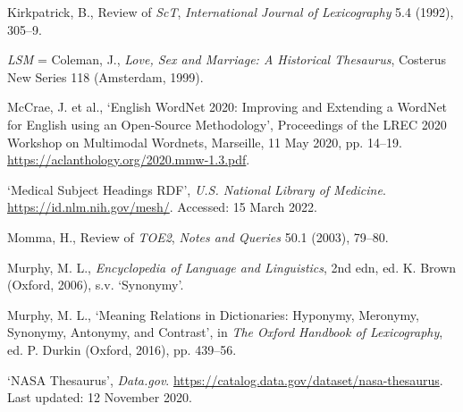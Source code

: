 \begin{list}{}
\item %
Kirkpatrick, B., Review of \textit{ScT}, \textit{International Journal of Lexicography} 5.4 (1992), 305–9.


\item %
\textit{LSM} = Coleman, J., \textit{Love, Sex and Marriage: A Historical Thesaurus}, Costerus New Series 118 (Amsterdam, 1999).


\item %
McCrae, J. et al., `English WordNet 2020: Improving and Extending a WordNet for English using an Open-Source Methodology', Proceedings of the LREC 2020 Workshop on Multimodal Wordnets, Marseille, 11 May 2020, pp. 14–19. \url{https://aclanthology.org/2020.mmw-1.3.pdf}.

\item %
`Medical Subject Headings RDF', \textit{U.S. National Library of Medicine}. \url{https://id.nlm.nih.gov/mesh/}. Accessed: 15 March 2022. 

\item %
Momma, H., Review of \textit{TOE2}, \textit{Notes and Queries} 50.1 (2003), 79–80.


\item %
Murphy, M. L., \textit{Encyclopedia of Language and Linguistics}, 2nd edn, ed. K. Brown (Oxford, 2006), s.v. `Synonymy'.

\item %
Murphy, M. L., `Meaning Relations in Dictionaries: Hyponymy, Meronymy, Synonymy, Antonymy, and Contrast', in \textit{The Oxford Handbook of Lexicography}, ed. P. Durkin (Oxford, 2016), pp. 439–56.

\item %
`NASA Thesaurus', \textit{Data.gov}. \url{https://catalog.data.gov/dataset/nasa-thesaurus}. Last updated: 12 November 2020.


\end{list}
